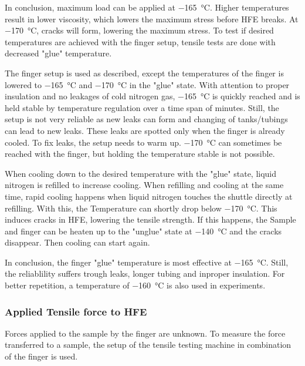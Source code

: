 In conclusion, maximum load can be applied at \SI{-165}{\degreeCelsius}. Higher temperatures result in lower viscosity, which lowers the maximum stress before HFE breaks. At \SI{-170}{\degreeCelsius}, cracks will form, lowering the maximum stress. To test if desired temperatures are achieved with the finger setup, tensile tests are done with decreased "glue" temperature.

The finger setup is used as described, except the temperatures of the finger is lowered to \SI{-165}{\degreeCelsius} and \SI{-170}{\degreeCelsius} in the "glue" state. With attention to proper insulation and no leakages of cold nitrogen gas, \SI{-165}{\degreeCelsius} is quickly reached and is held stable by temperature regulation over a time span of minutes. Still, the setup is not very reliable as new leaks can form and changing of tanks/tubings can lead to new leaks. These leaks are spotted only when the finger is already cooled. To fix leaks, the setup needs to warm up. \SI{-170}{\degreeCelsius} can sometimes be reached with the finger, but holding the temperature stable is not possible. 

When cooling down to the desired temperature with the "glue" state, liquid nitrogen is refilled to increase cooling. When refilling and cooling at the same time, rapid cooling happens when liquid nitrogen touches the shuttle directly at refilling. With this, the Temperature can shortly drop below \SI{-170}{\degreeCelsius}. This induces cracks in HFE, lowering the tensile strength. If this happens, the Sample and finger can be heaten up to the "unglue" state at \SI{-140}{\degreeCelsius} and the cracks disappear. Then cooling can start again.

In conclusion, the finger "glue" temperature is most effective at \SI{-165}{\degreeCelsius}. Still, the reliablility suffers trough leaks, longer tubing and inproper insulation. For better repetition, a temperature of \SI{-160}{\degreeCelsius} is also used in experiments.

\subsubsection{Applied Tensile force to HFE}
\label{section:forceofHFE}

Forces applied to the sample by the finger are unknown. To measure the force transferred to a sample, the setup of the tensile testing machine in combination of the finger is used.

